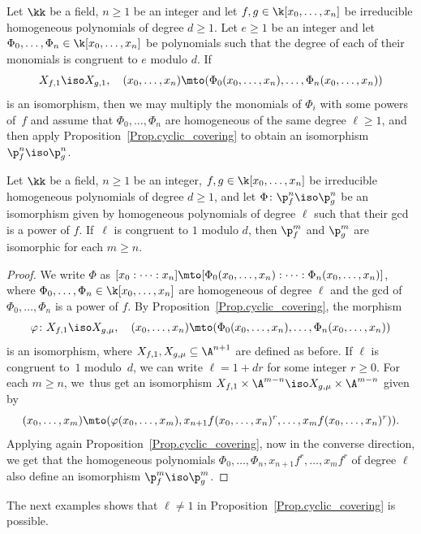 \begin{remark}\label{remark:Replacemodulo}
Let $\kk$ be a field, $n \geq 1$ be an integer and let $f,g\in \k[x_0,\ldots,x_n]$ be irreducible homogeneous polynomials of degree $d \ge 1$. Let $e \ge 1$ be an integer and let $\Phi_0,\ldots,\Phi_n\in \k[x_0,\ldots,x_n]$ be polynomials such that the degree of each of their monomials is congruent to $e$ modulo $d$. If
\[
X_{f, 1} \iso X_{g, 1}, \quad (x_0,\ldots,x_n)\mto (\Phi_0(x_0,\ldots,x_n),\ldots, \Phi_n(x_0,\ldots,x_n))
\]
is an isomorphism, then we may multiply the monomials of $\Phi_i$ with some powers of~$f$ and assume that $\Phi_0,\ldots,\Phi_n$ are homogeneous of the same degree $\ell \geq 1$, and then apply Proposition~\ref{Prop.cyclic_covering} to obtain an isomorphism $\p^n_f\iso \p^n_g$.
\end{remark}

\begin{lemma} \label{lemma:Replace_n_by_m}
Let $\kk$ be a field, $n \geq 1$ be an integer, $f,g\in \k[x_0,\ldots,x_n]$ be irreducible homogeneous polynomials of degree $d \ge 1$, and let $\Phi\colon \p^n_f \iso \p^n_g$ be an isomorphism given by homogeneous polynomials of degree $\ell$ such that their gcd is a power of $f$.
If~$\ell$ is congruent to $1$ modulo $d$, then $\p^{m}_f$ and $\p^{m}_g$ are isomorphic for each $m\ge n$.
\end{lemma}

\begin{proof}
We write $\Phi$ as $[x_0:\cdots:x_n] \mto [\Phi_0(x_0,\ldots,x_n):\cdots: \Phi_n(x_0,\ldots,x_n)]$, where $\Phi_0,\ldots,\Phi_n\in \k[x_0,\ldots,x_n]$ are homogeneous of degree $\ell$ and the $\mathrm{gcd}$ of $\Phi_0,\ldots,\Phi_ n$ is a power of $f$. By Proposition~\ref{Prop.cyclic_covering}, the morphism
\[
\varphi\colon X_{f,1} \iso X_{g,\mu}, \quad (x_0,\ldots,x_n) \mto (\Phi_0(x_0,\ldots,x_n),\ldots, \Phi_n(x_0,\ldots,x_n))
\]
is an isomorphism, where $X_{f,1}, X_{g,\mu}\subseteq \A^{n+1}$ are defined as before. If $\ell$ is congruent to~$1$ modulo~$d$, we can write $\ell=1+dr$ for some integer $r\ge 0$. For each $m\ge n$,
we~thus get an isomorphism
$X_{f,1}\times \A^{m-n}\iso X_{g,\mu}\times \A^{m-n}$ given by
\[
(x_0,\ldots,x_m) \mto (\varphi(x_0,\ldots,x_m), x_{n+1}f(x_0,\ldots,x_n)^r,\ldots, x_m f(x_0,\ldots,x_n)^r)).
\]
Applying again Proposition~\ref{Prop.cyclic_covering}, now in the converse direction, we get that the homogeneous polynomials $\Phi_0,\ldots,\Phi_n, x_{n+1} f^r,\ldots,x_m f^r$ of degree $\ell$ also define an isomorphism $\p^{m}_f\iso\p^{m}_g$.
\end{proof}
The next examples shows that $\ell\neq 1$ in Proposition~\ref{Prop.cyclic_covering}
is possible.

